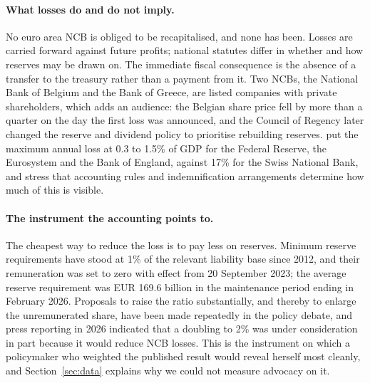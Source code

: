 \documentclass[11pt]{article}
\theoremstyle{plain}
\begin{document}
\paragraph{What losses do and do not imply.}
No euro area NCB is obliged to be recapitalised, and none has been. Losses are carried forward against future profits; national statutes differ in whether and how reserves may be drawn on. The immediate fiscal consequence is the absence of a transfer to the treasury rather than a payment from it. Two NCBs, the National Bank of Belgium and the Bank of Greece, are listed companies with private shareholders, which adds an audience: the Belgian share price fell by more than a quarter on the day the first loss was announced, and the Council of Regency later changed the reserve and dividend policy to prioritise rebuilding reserves. \citet{cecchetti2024} put the maximum annual loss at 0.3 to 1.5\% of GDP for the Federal Reserve, the Eurosystem and the Bank of England, against 17\% for the Swiss National Bank, and stress that accounting rules and indemnification arrangements determine how much of this is visible.

\paragraph{The instrument the accounting points to.}
The cheapest way to reduce the loss is to pay less on reserves. Minimum reserve requirements have stood at 1\% of the relevant liability base since 2012, and their remuneration was set to zero with effect from 20 September 2023; the average reserve requirement was EUR 169.6 billion in the maintenance period ending in February 2026. Proposals to raise the ratio substantially, and thereby to enlarge the unremunerated share, have been made repeatedly in the policy debate, and press reporting in 2026 indicated that a doubling to 2\% was under consideration in part because it would reduce NCB losses. This is the instrument on which a policymaker who weighted the published result would reveal herself most cleanly, and Section~\ref{sec:data} explains why we could not measure advocacy on it.
\end{document}
